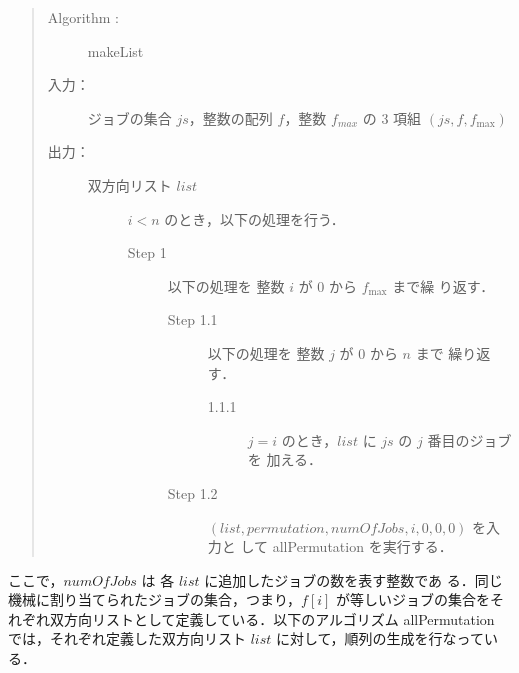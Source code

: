 \documentclass[12pt]{optlab-bachelor}
\begin{document}
\begin{quote}
  \begin{description}
    \item[{\sc Algorithm : }] {\sc makeList}
    \item[入力：] ジョブの集合 $js$，整数の配列 $f$，整数 $f_{max}$ の
    3 項組 $(js,f,f_{\max})$
    \item[出力：] 双方向リスト $list$
    \begin{description}
      \item[]  $i < n$ のとき，以下の処理を行う．
      \begin{description}
        \item[Step 1 ] 以下の処理を 整数 $i$ が 0 から $f_{\max}$ まで繰
        り返す．
        \begin{description}
          \item[Step 1.1 ] 以下の処理を 整数 $j$ が 0 から $n$ まで
          繰り返す．
          \begin{description}
            \item[ 1.1.1 ] $j = i$ のとき，$list$ に $js$ の $j$ 番目のジョブを
            加える．
          \end{description}
          \item[Step 1.2 ]  $(list,permutation,numOfJobs,i,0,0,0)$ を入力と
          して {\sc allPermutation} を実行する．
        \end{description}
      \end{description}
    \end{description}
  \end{description}
\end{quote}

ここで，$numOfJobs$ は 各 $list$ に追加したジョブの数を表す整数であ
る．同じ機械に割り当てられたジョブの集合，つまり，$f[i]$ が等しいジョブの集合をそれぞれ双方向リストとして定義している．以下のアルゴリズム {\sc allPermutation} では，それぞれ定義した双方向リスト $list$ に対して，順列の生成を行なっている．
\end{document}
